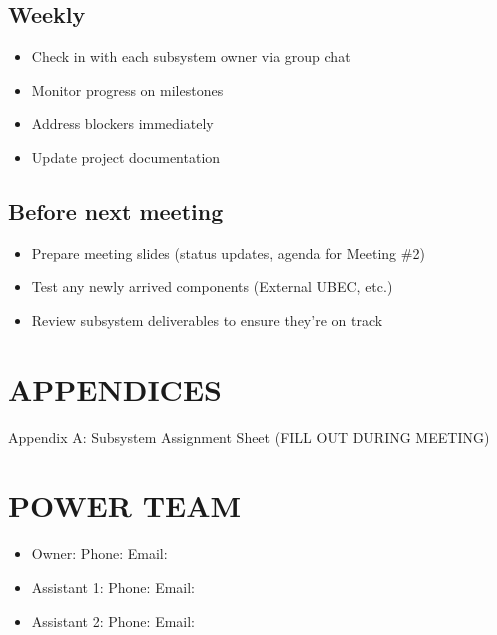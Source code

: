 \documentclass[11pt,letterpaper]{article}
\begin{document}
{\subsection{Weekly}

\begin{itemize}
  \item Check in with each subsystem owner via group chat
  \item Monitor progress on milestones
  \item Address blockers immediately
  \item Update project documentation
\end{itemize}

\subsection{Before next meeting}

\begin{itemize}
  \item Prepare meeting slides (status updates, agenda for Meeting \#2)
  \item Test any newly arrived components (External UBEC, etc.)
  \item Review subsystem deliverables to ensure they're on track
\end{itemize}

\section{APPENDICES}

Appendix A: Subsystem Assignment Sheet (FILL OUT DURING MEETING)\par

\section{POWER TEAM}

\begin{itemize}
  \item Owner: \underline{\hspace{4.95cm}}  Phone: \underline{\hspace{1.95cm}}  Email: \underline{\hspace{2.4cm}}
  \item Assistant 1: \underline{\hspace{4.05cm}}  Phone: \underline{\hspace{1.95cm}}  Email: \underline{\hspace{2.4cm}}
  \item Assistant 2: \underline{\hspace{4.05cm}}  Phone: \underline{\hspace{1.95cm}}  Email: \underline{\hspace{2.4cm}}
\end{itemize}

}
\end{document}
